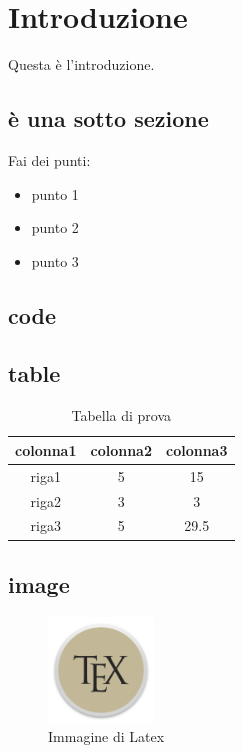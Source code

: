 %
%

\section{Introduzione}
Questa è l'introduzione\cite{ETICHETTA}.\\ 

\subsection{è una sotto sezione}
Fai dei punti:
\begin{itemize}
\item punto 1
\item punto 2
\item punto 3
\end{itemize}

\subsection{code}


\subsection{table}

\begin {table}[H]
\caption {Tabella di prova} \label{tab:tabprova} 
\begin{center}
\begin{tabular}{|c|c|c|}
  
  \hline
  \rowcolor[gray]{.6}
  \textbf{colonna1} & \textbf{colonna2} & \textbf{colonna3} \\
  
  \hline
  \rowcolor[gray]{.8}
  riga1 &  5 & 15\\
  
  \hline
  \rowcolor[gray]{.9}
  riga2 &  3 & 3\\
  
  \hline
  \rowcolor[gray]{.8}
  riga3 & 5 & 29.5\\
  
  \hline
\end{tabular} 
\end{center}
\end{table}

\subsection{image}

\begin{figure}[htbp]
\begin{flushright}
\centering
\includegraphics[width=0.25\textwidth]{figure/tex.png}
\caption{Immagine di Latex}
\label{fig:gc}
\end{flushright}
\end{figure}
